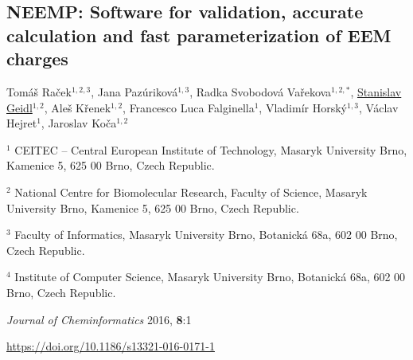 \begin{center}

\section{NEEMP: Software
for validation, accurate calculation and fast parameterization of EEM charges}

Tomáš Raček$^{1,2,3}$, Jana Pazúriková$^{1,3}$, Radka Svobodová Vařekova$^{1,2,*}$,
\underline{Stanislav Geidl$^{1,2}$}, Aleš Křenek$^{1,2}$, Francesco Luca
Falginella$^1$, Vladimír Horský$^{1,3}$, Václav Hejret$^1$, Jaroslav Koča$^{1,2}$


\vspace{1cm}


$^1$ CEITEC -- Central European Institute of Technology,
Masaryk University Brno, Kamenice 5, 625 00 Brno, Czech Republic.

$^2$ National Centre for Biomolecular Research, Faculty of Science,
Masaryk University Brno, Kamenice 5, 625 00 Brno, Czech Republic.

$^3$ Faculty of Informatics, Masaryk University Brno, Botanická 68a, 602 00 Brno,
Czech Republic.

$^4$ Institute of Computer Science, Masaryk University Brno, Botanická 68a,
602 00 Brno, Czech Republic.

\vspace{1cm}

\textit{Journal of Cheminformatics} 2016, \textbf{8}:1

\vspace{1cm}

\url{https://doi.org/10.1186/s13321-016-0171-1}

\end{center}


